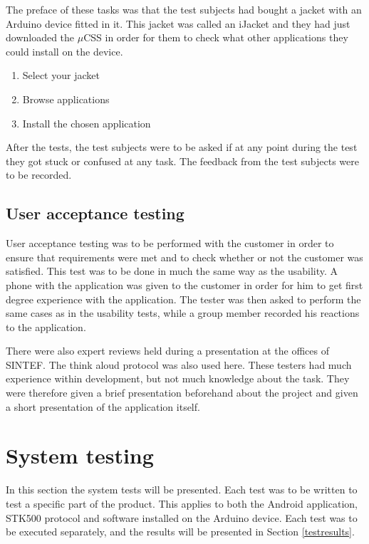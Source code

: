 			The preface of these tasks was that the test subjects had bought a jacket with an Arduino device fitted in it. This jacket was called an iJacket and they had just downloaded the $\mu$CSS in order for them to check what other applications they could install on the device.

			\vspace{6 mm}
			\begin{enumerate}
			 \item Select your jacket
			 \item Browse applications
			 \item Install the chosen application
			\end{enumerate}
			\vspace{6 mm}

			After the tests, the test subjects were to be asked if at any point during the test they got stuck or confused at any task. The feedback from the test subjects were to be recorded.

		\subsection{User acceptance testing}
		User acceptance testing was to be performed with the customer in order to ensure that requirements were met and to check whether or not the customer was satisfied. This test was to be done in much the same way as the usability. A phone with the application was given to the customer in order for him to get first degree experience with the application. The tester was then asked to perform the same cases as in the usability tests, while a group member recorded his reactions to the application.\\
		\newline

		There were also expert reviews held during a presentation at the offices of SINTEF. The think aloud protocol was also used here. These testers had much experience within development, but not much knowledge about the task. They were therefore given a brief presentation beforehand about the project and given a short presentation of the application itself.\\

	\section{System testing}
	\label{systemtesting}
	In this section the system tests will be presented. Each test was to be written to test a specific part of the product. This applies to both the Android application, STK500 protocol and software installed on the Arduino device. Each test was to be executed separately, and the results will be presented in Section \ref{testresults}.

